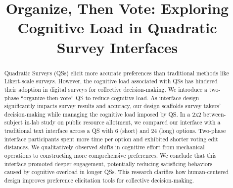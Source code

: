 \documentclass[sigconf, authorversion]{acmart}
\begin{document}

\title{Organize, Then Vote: Exploring Cognitive Load in Quadratic Survey Interfaces}











\renewcommand{\shortauthors}{Ti-Chung Cheng et al.}

\begin{abstract}
    Quadratic Surveys (QSs) elicit more accurate preferences than traditional methods like Likert-scale surveys. However, the cognitive load associated with QSs has hindered their adoption in digital surveys for collective decision-making. We introduce a two-phase ``organize-then-vote'' QS to reduce cognitive load. As interface design significantly impacts survey results and accuracy, our design scaffolds survey takers' decision-making while managing the cognitive load imposed by QS. In a 2x2 between-subject in-lab study on public resource allotment, we compared our interface with a traditional text interface across a QS with 6 (short) and 24 (long) options. Two-phase interface participants spent more time per option and exhibited shorter voting edit distances. We qualitatively observed shifts in cognitive effort from mechanical operations to constructing more comprehensive preferences. We conclude that this interface promoted deeper engagement, potentially reducing satisficing behaviors caused by cognitive overload in longer QSs. This research clarifies how human-centered design improves preference elicitation tools for collective decision-making.
\end{abstract}
\end{document}
